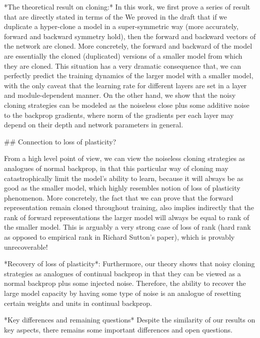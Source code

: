 *The theoretical result on cloning:* In this work, we first prove a series of result that are directly stated in terms of the 
We proved in the draft that if we duplicate a hyper-clone a model in a super-symmetric way (more accurately, forward and backward symmetry hold), then the forward and backward vectors of the network are cloned. More concretely, the forward and backward of the model are essentially the cloned (duplicated) versions of a smaller model from which they are cloned. This situation has a very dramatic consequence that, we can perfectly predict the training dynamics of the larger model with a smaller model, with the only caveat that the learning rate for different layers are set in a layer and module-dependent manner.  On the other hand, we show that the noisy cloning strategies can be modeled as the noiseless close plus some additive noise to the backprop gradients, where norm of the gradients per each layer may depend on their depth and network parameters in general. 

## Connection to loss of plasticity?

From a high level point of view, we can view the noiseless cloning strategies as analogues of normal backprop, in that this particular way of cloning may catastrophically limit the model's ability to learn, because it will always be as good as the smaller model, which highly resembles  notion of loss of plasticity phenomenon. 
More concretely, the fact that we can prove that the forward representation remain cloned throughout training, also implies indirectly that the rank of forward representations the larger model will always be equal to rank of the smaller model. This is arguably a very strong case of loss of rank (hard rank as opposed to empirical rank in Richard Sutton’s paper), which is provably unrecoverable! 


*Recovery of loss of plasticity*: Furthermore, our theory shows that  noisy cloning strategies as analogues of continual backprop in that they can be viewed as a normal backprop plus some injected noise.  Therefore, the ability to recover the large model capacity by having some type of noise is an analogue of resetting certain weights and units in continual backprop. 

*Key differences and remaining questions* Despite the similarity of our results on key aspects, there remains some important differences and open questions. 


